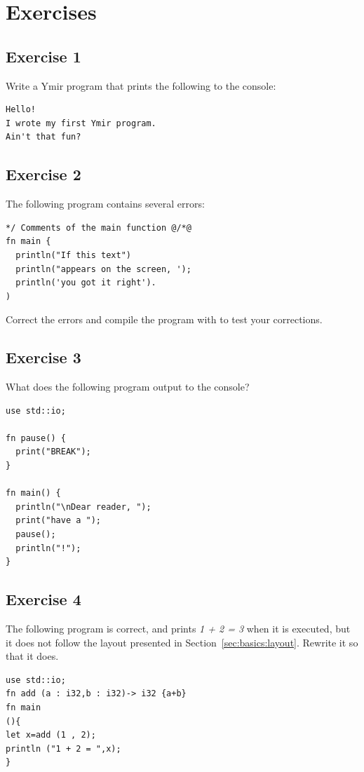 \section*{Exercises}
%
\subsection*{Exercise 1}

Write a Ymir program that prints the following to the console:
\begin{verbatim}
Hello!
I wrote my first Ymir program.
Ain't that fun?
\end{verbatim}

\subsection*{Exercise 2}
The following program contains several errors:

\begin{lstlisting}[style=coloredverbatimError, escapechar=@, caption=Ymir program with errors]
*/ Comments of the main function @/*@
fn main {
  println("If this text")
  println("appears on the screen, ');
  println('you got it right').
)
\end{lstlisting}
Correct the errors and compile the program with  to test your
corrections.

\subsection*{Exercise 3}

What does the following program output to the console?
\begin{lstlisting}[style=coloredverbatim]
use std::io;

fn pause() {
  print("BREAK");
}

fn main() {
  println("\nDear reader, ");
  print("have a ");
  pause();
  println("!");
}
\end{lstlisting}

\subsection*{Exercise 4}

The following program is correct, and prints \textit{1 + 2 = 3} when it is
executed, but it does not follow the layout presented in
Section~\ref{sec:basics:layout}. Rewrite it so that it does.

\begin{lstlisting}[style=coloredverbatim]
use std::io;
fn add (a : i32,b : i32)-> i32 {a+b}
fn main
(){
let x=add (1 , 2);
println ("1 + 2 = ",x);
}
\end{lstlisting}

